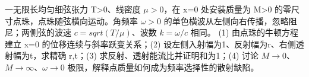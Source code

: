 一无限长均匀细弦张力 T>0、线密度 \(\mu >0\)，在 x=0 处安装质量为 M>0 的零尺寸点珠，点珠随弦横向运动。角频率 \(\omega >0\) 的单色横波从左侧向右传播，忽略阻尼；两侧弦的波速 \(c=sqrt(T/\mu )\)、波数 \(k=\omega /c\) 相同。
(1) 由点珠的牛顿方程建立 x=0 的位移连续与斜率跃变关系；(2) 设左侧入射幅为1、反射幅为r、右侧透射幅为t，求精确 r,t；(3) 求反射、透射能流比并证明和为1；(4) 讨论 \(M\to 0\)、\(M\to \infty \)、\(\omega \to 0\) 极限，解释点质量如何成为频率选择性的散射缺陷。
